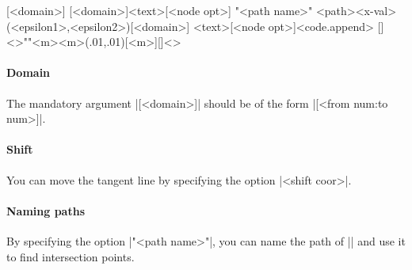 \begin{tzdef}
[<domain>]
[<domain>]{<text>}[<node opt>]
"<path name>"
            {<path>}{<x-val>}(<epsilon1>,<epsilon2>)[<domain>]
            {<text>}[<node opt>]<code.append>
  []<>""{<m>}{<m>}(.01,.01)[<m>]{}[]<>
\end{tzdef}


\paragraph{Domain}
The mandatory argument |[<domain>]| should be of the form |[<from num:to num>]|.

\begin{tzcode}{.3}
{}
\end{tzcode}


\paragraph{Shift}
You can move the tangent line by specifying the option |<shift coor>|.

\begin{tzcode}{.3}
\end{tzcode}

\paragraph{Naming paths}
By specifying the option |"<path name>"|, you can name the path of |\tztangentat| and use it to find intersection points.

\begin{tzcode}{.3}
\end{tzcode}

